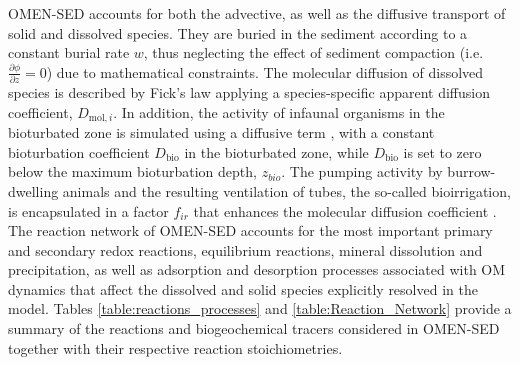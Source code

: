\documentclass[gmd, manuscript]{copernicus}
\begin{document}
OMEN-SED accounts for both the advective, as well as the diffusive transport of solid and dissolved species. They are buried in the sediment according to a constant burial rate $w$, thus 
neglecting the effect of sediment compaction (i.e. $\frac{\partial \phi}{\partial z}=0$) due to mathematical constraints. 
The molecular diffusion of dissolved species is described by Fick's law applying a species-specific apparent diffusion coefficient, $D_{\mathrm{mol},i}$.  In addition, the activity of infaunal organisms in the bioturbated zone 
is simulated using a diffusive term \citep[e.g.][]{boudreau_mathematics_1986}, with a constant bioturbation coefficient $D_{\mathrm{bio}}$ in the bioturbated zone, 
while $D_{\mathrm{bio}}$ is set to zero below the maximum bioturbation depth, $z_{bio}$. 
The pumping activity by burrow-dwelling animals and the resulting ventilation of tubes, the so-called bioirrigation, is encapsulated in a factor $f_{ir}$ that enhances the molecular diffusion coefficient 
\citep[hence, $D_{i,0}=D_{\mathrm{mol},i}\cdot f_{ir}$,][]{soetaert_model_1996}. 
The reaction network of OMEN-SED accounts for the most important primary and secondary redox reactions, equilibrium reactions, mineral dissolution and precipitation, as well as adsorption and desorption processes associated with OM dynamics 
that affect the dissolved and solid species explicitly resolved in the model. Tables \ref{table:reactions_processes} and \ref{table:Reaction_Network} provide a summary of the reactions and biogeochemical tracers considered in OMEN-SED together 
with their respective reaction stoichiometries. %
\end{document}
